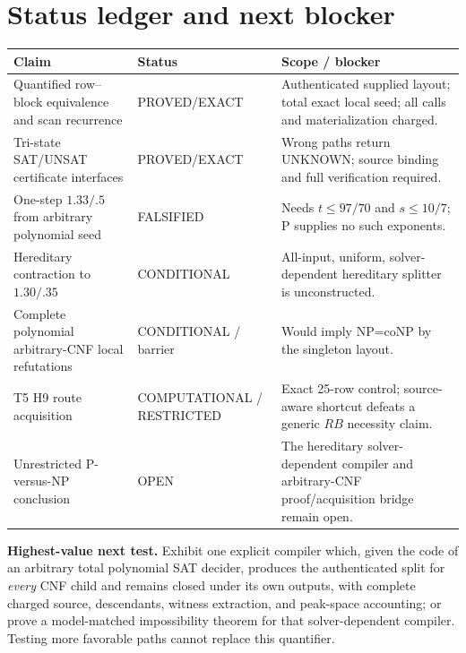 \documentclass[11pt]{article}
\begin{document}
\section{Status ledger and next blocker}

\begin{center}
\begin{tabular}{p{.24\linewidth}p{.15\linewidth}p{.53\linewidth}}
\toprule
Claim & Status & Scope / blocker\\
\midrule
Quantified row--block equivalence and scan recurrence & PROVED/EXACT & Authenticated supplied layout; total exact local seed; all calls and materialization charged.\\
Tri-state SAT/UNSAT certificate interfaces & PROVED/EXACT & Wrong paths return UNKNOWN; source binding and full verification required.\\
One-step $1.33/.5$ from arbitrary polynomial seed & FALSIFIED & Needs $t\le97/70$ and $s\le10/7$; P supplies no such exponents.\\
Hereditary contraction to $1.30/.35$ & CONDITIONAL & All-input, uniform, solver-dependent hereditary splitter is unconstructed.\\
Complete polynomial arbitrary-CNF local refutations & CONDITIONAL / barrier & Would imply NP=coNP by the singleton layout.\\
T5 H9 route acquisition & COMPUTATIONAL / RESTRICTED & Exact 25-row control; source-aware shortcut defeats a generic $RB$ necessity claim.\\
Unrestricted P-versus-NP conclusion & OPEN & The hereditary solver-dependent compiler and arbitrary-CNF proof/acquisition bridge remain open.\\
\bottomrule
\end{tabular}
\end{center}

\textbf{Highest-value next test.}  Exhibit one explicit compiler which, given the code of an arbitrary total polynomial SAT decider, produces the authenticated split for \emph{every} CNF child and remains closed under its own outputs, with complete charged source, descendants, witness extraction, and peak-space accounting; or prove a model-matched impossibility theorem for that solver-dependent compiler.  Testing more favorable paths cannot replace this quantifier.
\end{document}
